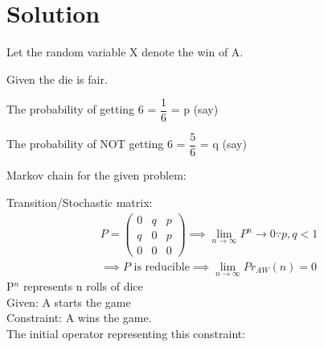 \documentclass[journal,12pt,twocolumn]{IEEEtran}
\theoremstyle{remark}
\newcommand{\myvec}[1]{\ensuremath{\begin{pmatrix}#1\end{pmatrix}}}
\numberwithin{equation}{subsection}
\begin{document}
\section{\Large Solution}
\begin{description}
    \item Let the random variable X denote the win of A.
    \item Given the die is fair.
    \item The probability of getting 6 = $\dfrac{1}{6}$ = p (say)
    \item The probability of NOT getting 6 = $\dfrac{5}{6}$ = q (say)
    \item Markov chain for the given problem:
\end{description}
\begin{center}
\end{center}
Transition/Stochastic matrix:
\begin{align*}
    P = \myvec{
    0 & q & p\\
    q & 0 & p\\
    0 & 0 & 0}
    \implies \lim_{n \to \infty} P^n \xrightarrow{} 0 \because p , q < 1\\
    \implies P \text{ is reducible}
    \implies \lim_{n \to \infty}Pr_{AW}(n) = 0
\end{align*}
P$^n$ represents n rolls of dice\\
Given: A starts the game\\
Constraint: A wins the game.\\
The initial operator representing this constraint:\\
\end{document}
